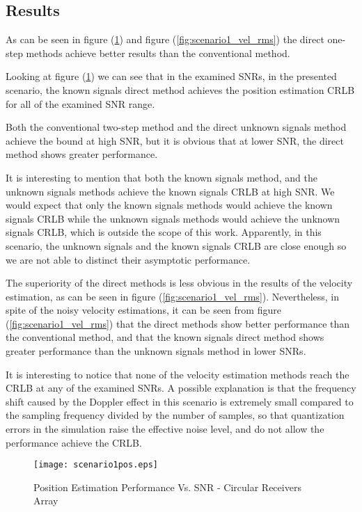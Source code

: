 \subsection*{Results}
As can be seen in figure (\ref{fig:scenario1_pos_rms}) and figure (\ref{fig:scenario1_vel_rms}) the direct one-step methods achieve better results than the conventional method.

Looking at figure (\ref{fig:scenario1_pos_rms}) we can see that in the examined SNRs, in the presented scenario, the known signals direct method achieves the position estimation CRLB for all of the examined SNR range.

Both the conventional two-step method and the direct unknown signals method achieve the bound at high SNR, but it is obvious that at lower SNR, the direct method shows greater performance.

It is interesting to mention that both the known signals method, and the unknown signals methods achieve the known signals CRLB at high SNR. We would expect that only the known signals methods would achieve the known signals CRLB while the unknown signals methods would achieve the unknown signals CRLB, which is outside the scope of this work. Apparently, in this scenario, the unknown signals and the known signals CRLB are close enough so we are not able to distinct their asymptotic performance.

The superiority of the direct methods is less obvious in the results of the velocity estimation, as can be seen in figure (\ref{fig:scenario1_vel_rms}). Nevertheless, in spite of the noisy velocity estimations, it can be seen from figure (\ref{fig:scenario1_vel_rms}) that the direct methods show better performance than the conventional method, and that the known signals direct method shows greater performance than the unknown signals method in lower SNRs.

It is interesting to notice that none of the velocity estimation methods reach the CRLB at any of the examined SNRs. A possible explanation is that the frequency shift caused by the Doppler effect in this scenario is extremely small compared to the sampling frequency divided by the number of samples, so that quantization errors in the simulation raise the effective noise level, and do not allow the performance achieve the CRLB.



\begin{figure}
\begin{center}
\texttt{[image: scenario1pos.eps]} 
\end{center}
\caption{Position Estimation Performance Vs. SNR - Circular Receivers Array}
\label{fig:scenario1_pos_rms}
\end{figure}

